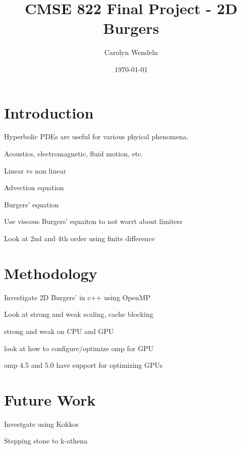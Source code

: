 \documentclass{article}
\title{CMSE 822 Final Project - 2D Burgers}
\author{Carolyn Wendeln}
\date{\today}
\begin{document}
\maketitle

\section{Introduction}

Hyperbolic PDEs are useful for various phyical phenomena.

Acoustics, electromagnetic, fluid motion, etc.

Linear vs non linear 

Advection equation

Burgers' equation

Use viscous Burgers' equaiton to not worrt about limiters

Look at 2nd and 4th order using finite difference

\section{Methodology}

Investigate 2D Burgers' in c++ using OpenMP

Look at strong and weak scaling, cache blocking 

strong and weak on CPU and GPU

look at how to configure/optimize omp for GPU

omp 4.5 and 5.0 have support for optimizing GPUs

\section{Future Work}

Investgate using Kokkos 

Stepping stone to k-athena
\end{document}
